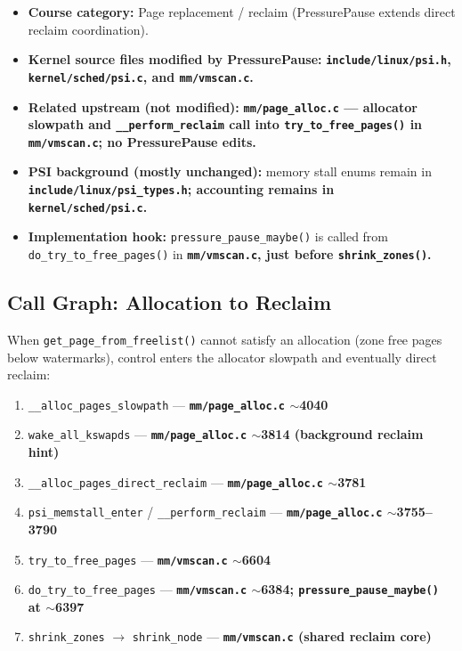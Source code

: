 \documentclass[12pt,a4paper]{article}
\newcommand{\srcfile}[1]{\begingroup\bfseries\color{aublue}\nolinkurl{#1}\endgroup}
\begin{document}
\begin{itemize}[leftmargin=1.2cm]
    \item \textbf{Course category:} Page replacement / reclaim (PressurePause extends direct reclaim coordination).
    \item \textbf{Kernel source files modified by PressurePause:} \srcfile{include/linux/psi.h}, \srcfile{kernel/sched/psi.c}, and \srcfile{mm/vmscan.c}.
    \item \textbf{Related upstream (not modified):} \srcfile{mm/page_alloc.c} --- allocator slowpath and \texttt{\_\_perform\_reclaim} call into \texttt{try\_to\_free\_pages()} in \srcfile{mm/vmscan.c}; no PressurePause edits.
    \item \textbf{PSI background (mostly unchanged):} memory stall enums remain in \srcfile{include/linux/psi_types.h}; accounting remains in \srcfile{kernel/sched/psi.c}.
    \item \textbf{Implementation hook:} \texttt{pressure\_pause\_maybe()} is called from \texttt{do\_try\_to\_free\_pages()} in \srcfile{mm/vmscan.c}, just before \texttt{shrink\_zones()}.
\end{itemize}

\subsection{Call Graph: Allocation to Reclaim}

When \texttt{get\_page\_from\_freelist()} cannot satisfy an allocation (zone free pages below watermarks), control enters the allocator slowpath and eventually direct reclaim:

\begin{enumerate}[leftmargin=1.2cm]
    \item \texttt{\_\_alloc\_pages\_slowpath} --- \srcfile{mm/page_alloc.c} $\sim$4040
    \item \texttt{wake\_all\_kswapds} --- \srcfile{mm/page_alloc.c} $\sim$3814 (background reclaim hint)
    \item \texttt{\_\_alloc\_pages\_direct\_reclaim} --- \srcfile{mm/page_alloc.c} $\sim$3781
    \item \texttt{psi\_memstall\_enter} / \texttt{\_\_perform\_reclaim} --- \srcfile{mm/page_alloc.c} $\sim$3755--3790
    \item \texttt{try\_to\_free\_pages} --- \srcfile{mm/vmscan.c} $\sim$6604
    \item \texttt{do\_try\_to\_free\_pages} --- \srcfile{mm/vmscan.c} $\sim$6384; \texttt{pressure\_pause\_maybe()} at $\sim$6397
    \item \texttt{shrink\_zones} $\rightarrow$ \texttt{shrink\_node} --- \srcfile{mm/vmscan.c} (shared reclaim core)
\end{enumerate}
\end{document}
